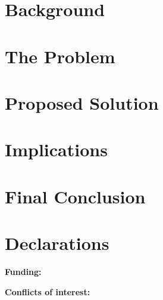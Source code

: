 \documentclass[11pt,a4paper]{article}
\begin{document}
\section{Background}
\label{sec:background}

\section{The Problem}
\label{sec:problem}

\section{Proposed Solution}
\label{sec:proposal}

\section{Implications}
\label{sec:implications}

\section{Final Conclusion}
\label{sec:final}

\section*{Declarations}

\noindent\textbf{Funding:} %

\noindent\textbf{Conflicts of interest:} %
\end{document}
